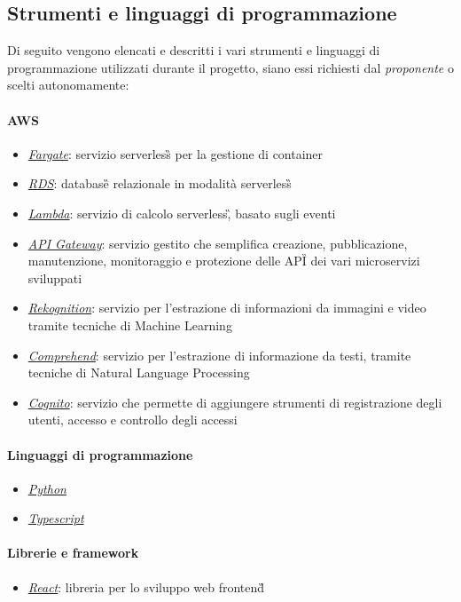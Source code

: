 \subsection{Strumenti e linguaggi di programmazione}
Di seguito vengono elencati e descritti i vari strumenti e linguaggi di programmazione utilizzati durante il progetto, siano essi richiesti dal \emph{proponente} o scelti autonomamente:
\paragraph*{AWS}
\begin{itemize}
	\item \href{https://aws.amazon.com/fargate/}{\emph{Fargate}}: servizio serverless\G{} per la gestione di container
	\item \href{https://aws.amazon.com/rds/}{\emph{RDS}}: database\G{} relazionale in modalità serverless\G
	\item \href{https://aws.amazon.com/lambda/}{\emph{Lambda}}: servizio di calcolo serverless\G, basato sugli eventi
	\item \href{https://aws.amazon.com/fargate/}{\emph{API Gateway}}: servizio gestito che semplifica creazione, pubblicazione, manutenzione, monitoraggio e protezione delle API\G{} dei vari microservizi sviluppati
	\item \href{https://aws.amazon.com/rekognition/}{\emph{Rekognition}}: servizio per l'estrazione di informazioni da immagini e video tramite tecniche di Machine Learning
	\item \href{https://aws.amazon.com/comprehend/}{\emph{Comprehend}}: servizio per l'estrazione di informazione da testi, tramite tecniche di Natural Language Processing
	\item \href{https://aws.amazon.com/cognito/}{\emph{Cognito}}: servizio che permette di aggiungere strumenti di registrazione degli utenti, accesso e controllo degli accessi 
\end{itemize}
\paragraph*{Linguaggi di programmazione}
\begin{itemize}
	\item \href{https://www.python.org/}{\emph{Python}}
	\item \href{https://www.typescriptlang.org/}{\emph{Typescript}}
\end{itemize}
\paragraph*{Librerie e framework}
\begin{itemize}
	\item \href{https://reactjs.org/}{\emph{React}}: libreria per lo sviluppo web frontend\G
\end{itemize}

